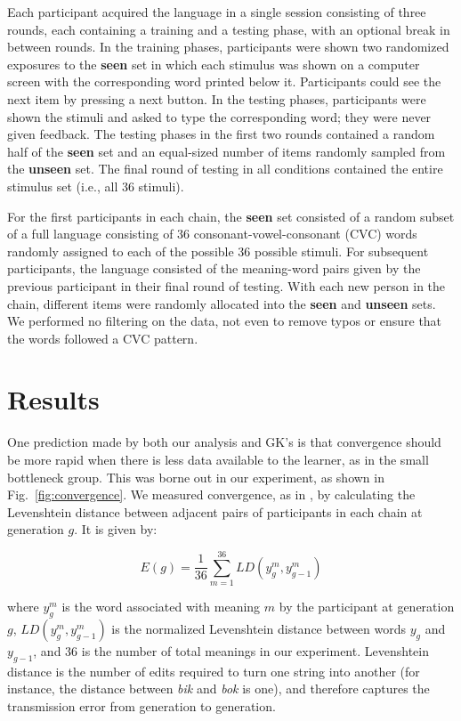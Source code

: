 \documentclass{apa}
\begin{document}
Each participant acquired the language in a single session consisting of three rounds, each containing a training and a testing phase, with an optional break in between rounds. In the training phases, participants were shown two randomized exposures to the {\bf seen} set in which each stimulus was shown on a computer screen with the corresponding word printed below it. Participants could see the next item by pressing a {\sc next} button. In the testing phases, participants were shown the stimuli and asked to type the corresponding word; they were never given feedback. The testing phases in the first two rounds contained a random half of the {\bf seen} set and an equal-sized number of items randomly sampled from the {\bf unseen} set. The final round of testing in all conditions contained the entire stimulus set (i.e., all 36 stimuli).

For the first participants in each chain, the {\bf seen} set consisted of a random subset of a full language consisting of 36 consonant-vowel-consonant (CVC) words randomly assigned to each of the possible 36 possible stimuli. For subsequent participants, the language consisted of the meaning-word pairs given by the previous participant in their final round of testing.  With each new person in the chain, different items were randomly allocated into the {\bf seen} and {\bf unseen} sets. We performed no filtering on the data, not even to remove typos or ensure that the words followed a CVC pattern.


\section{Results}

One prediction made by both our analysis and GK's is that convergence should be more rapid when there is less data available to the learner, as in the {\sc small} bottleneck group. This was borne out in our experiment, as shown in Fig.~\ref{fig:convergence}. We measured convergence, as in \cite{kirbyetal08}, by calculating the Levenshtein distance \cite{levenshtein66} between adjacent pairs of participants in each chain at generation $g$. It is given by:

\begin{equation}
E(g) = \frac{1}{36} \sum_{m=1}^{36} LD(y_g^m,y_{g-1}^m)
\label{eq:ld}
\end{equation}

\noindent
where $y_g^m$ is the word associated with meaning $m$ by the participant at generation $g$, $LD(y_g^m,y_{g-1}^m)$ is the normalized Levenshtein distance between words $y_g$ and $y_{g-1}$, and $36$ is the number of total meanings in our experiment. Levenshtein distance is the number of edits required to turn one string into another (for instance, the distance between {\it bik} and {\it bok} is one), and therefore captures the transmission error from generation to generation.
\end{document}
